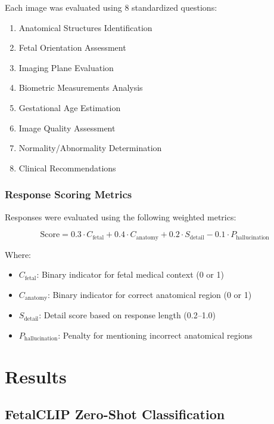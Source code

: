 \documentclass[11pt,a4paper]{article}
\begin{document}
Each image was evaluated using 8 standardized questions:

\begin{enumerate}
    \item Anatomical Structures Identification
    \item Fetal Orientation Assessment
    \item Imaging Plane Evaluation
    \item Biometric Measurements Analysis
    \item Gestational Age Estimation
    \item Image Quality Assessment
    \item Normality/Abnormality Determination
    \item Clinical Recommendations
\end{enumerate}

\subsubsection{Response Scoring Metrics}

Responses were evaluated using the following weighted metrics:

\begin{equation}
\text{Score} = 0.3 \cdot C_{\text{fetal}} + 0.4 \cdot C_{\text{anatomy}} + 0.2 \cdot S_{\text{detail}} - 0.1 \cdot P_{\text{hallucination}}
\end{equation}

Where:
\begin{itemize}
    \item $C_{\text{fetal}}$: Binary indicator for fetal medical context (0 or 1)
    \item $C_{\text{anatomy}}$: Binary indicator for correct anatomical region (0 or 1)
    \item $S_{\text{detail}}$: Detail score based on response length (0.2--1.0)
    \item $P_{\text{hallucination}}$: Penalty for mentioning incorrect anatomical regions
\end{itemize}

\section{Results}

\subsection{FetalCLIP Zero-Shot Classification}
\end{document}
